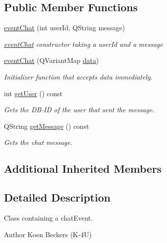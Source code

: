 \subsection*{Public Member Functions}
\begin{DoxyCompactItemize}
\item 
\hyperlink{classshared_1_1events_1_1event_chat_ae8e23aacd573c9d738fa092706012e98}{event\-Chat} (int user\-Id, Q\-String message)
\begin{DoxyCompactList}\small\item\em \hyperlink{classshared_1_1events_1_1event_chat}{event\-Chat} constructor taking a user\-Id and a message \end{DoxyCompactList}\item 
\hyperlink{classshared_1_1events_1_1event_chat_a5289bfeafe5493f849097dbeda251170}{event\-Chat} (Q\-Variant\-Map \hyperlink{classshared_1_1events_1_1cls_event_a6cfb6b96d72fc1e7a101e61061ec2755}{data})
\begin{DoxyCompactList}\small\item\em Initializer function that accepts data immediately. \end{DoxyCompactList}\item 
int \hyperlink{classshared_1_1events_1_1event_chat_affa9c414f40d61277b690efd4013f550}{get\-User} () const 
\begin{DoxyCompactList}\small\item\em Gets the D\-B-\/\-I\-D of the user that sent the message. \end{DoxyCompactList}\item 
Q\-String \hyperlink{classshared_1_1events_1_1event_chat_a10a61f130fb402e63922cd0b34468c8e}{get\-Message} () const 
\begin{DoxyCompactList}\small\item\em Gets the chat message. \end{DoxyCompactList}\end{DoxyCompactItemize}
\subsection*{Additional Inherited Members}


\subsection{Detailed Description}
Class containing a chat\-Event. 

\begin{DoxyAuthor}{Author}
Koen Beckers (K-\/4\-U) 
\end{DoxyAuthor}


